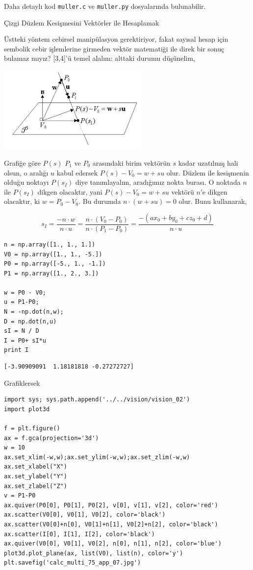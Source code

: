 \documentclass[12pt,fleqn]{article}\usepackage{../../common}
\begin{document}
Daha detaylı kod \verb!muller.c! ve \verb!muller.py! dosyalarında bulunabilir.

Çizgi Düzlem Kesişmesini Vektörler ile Hesaplamak

Üstteki yöntem cebirsel manipülasyon gerektiriyor, fakat sayısal hesap için
sembolik cebir işlemlerine girmeden vektör matematiği ile direk bir sonuç
bulamaz mıyız? [3,4]'ü temel alalım: alttaki durumu düşünelim, 

\includegraphics[width=20em]{calc_multi_75_app_06.jpg}

Grafiğe göre $P(s)$ $P_1$ ve $P_0$ arasındaki birim vektörün $s$ kadar
uzatılmış hali olsun, o aralığı $u$ kabul edersek $P(s)-V_0 = w + su$
olur. Düzlem ile kesişmenin olduğu noktayı $P(s_I)$ diye tanımlayalım,
aradığımız nokta burası. O noktada $n$ ile $P(s_I)$ dikgen olacaktır, yani
$P(s) - V_0 = w + su$ vektörü $n$'e dikgen olacaktır, ki $w=P_0-V_0$. Bu
durumda $n \cdot (w+su) = 0$ olur. Bunu kullanarak,

$$ s_I = \frac{-n \cdot w}{n \cdot u} = 
\frac{n \cdot (V_0 - P_0)}{n \cdot (P_1-P_0)} = 
\frac{-(ax_0 + by_0 + cz_0 + d)}{n \cdot u}
$$

\begin{verbatim}
n = np.array([1., 1., 1.])
V0 = np.array([1., 1., -5.])
P0 = np.array([-5., 1., -1.])
P1 = np.array([1., 2., 3.])

w = P0 - V0;
u = P1-P0;
N = -np.dot(n,w);
D = np.dot(n,u)
sI = N / D
I = P0+ sI*u
print I
\end{verbatim}

\begin{verbatim}
[-3.90909091  1.18181818 -0.27272727]
\end{verbatim}

Grafiklersek

\begin{verbatim}
import sys; sys.path.append('../../vision/vision_02')
import plot3d

f = plt.figure()
ax = f.gca(projection='3d')
w = 10
ax.set_xlim(-w,w);ax.set_ylim(-w,w);ax.set_zlim(-w,w)
ax.set_xlabel("X")
ax.set_ylabel("Y")
ax.set_zlabel("Z")
v = P1-P0
ax.quiver(P0[0], P0[1], P0[2], v[0], v[1], v[2], color='red')
ax.scatter(V0[0], V0[1], V0[2], color='black')
ax.scatter(V0[0]+n[0], V0[1]+n[1], V0[2]+n[2], color='black')
ax.scatter(I[0], I[1], I[2], color='black')
ax.quiver(V0[0], V0[1], V0[2], n[0], n[1], n[2], color='blue')
plot3d.plot_plane(ax, list(V0), list(n), color='y')
plt.savefig('calc_multi_75_app_07.jpg')
\end{verbatim}
\end{document}

